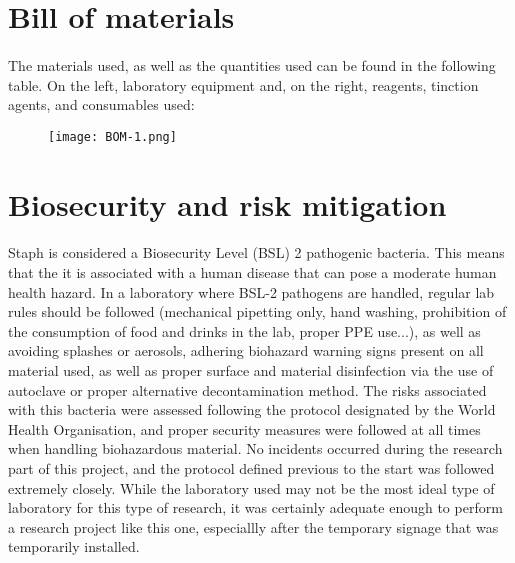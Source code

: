 \section{Bill of materials}
\paragraph{}The materials used, as well as the quantities used can be found in the following table. On the left, laboratory equipment and, on the right, reagents, tinction agents, and consumables used:
\begin{center}\begin{figure}\texttt{[image: BOM-1.png]}\end{figure}\end{center}
\section{Biosecurity and risk mitigation}
\paragraph{}Staph is considered a Biosecurity Level (BSL) 2 pathogenic bacteria\cite{cheungPathogenicityVirulenceStaphylococcus2021}. This means that the it is associated with a human disease that can pose a moderate human health hazard. In a laboratory where BSL-2 pathogens are handled, regular lab rules should be followed (mechanical pipetting only, hand washing, prohibition of the consumption of food and drinks in the lab, proper PPE use...), as well as avoiding splashes or aerosols, adhering biohazard warning signs present on all material used, as well as proper surface and material disinfection via the use of autoclave or proper alternative decontamination method\cite{worldhealthorganizationLaboratoryBiosafetyManual2020}.\newline
The risks associated with this bacteria were assessed following the protocol designated by the World Health Organisation\cite{worldhealthorganizationLaboratoryBiosafetyManual2020}, and proper security measures were followed at all times when handling biohazardous material. No incidents occurred during the research part of this project, and the protocol defined previous to the start was followed extremely closely. While the laboratory used may not be the most ideal type of laboratory for this type of research, it was certainly adequate enough to perform a research project like this one, especiallly after the temporary signage that was temporarily installed.

